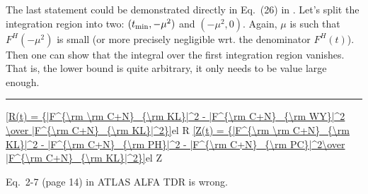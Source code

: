 The last statement could be demonstrated directly in Eq.~(26) in . Let's split the integration region into two: $(t_{\rm min}, -\mu^2)$ and $(-\mu^2, 0)$. Again, $\mu$ is such that $F^H(-\mu^2)$ is small (or more precisely negligible wrt. the denominator $F^H(t)$). Then one can show that the integral over the first integration region vanishes. That is, the lower bound is quite arbitrary, it only needs to be value large enough.

\iffalse
\eqref{F^{\rm C+H}_{\rm WY} = F^C(t) e^{i\al\Ph(t) + F^H(t) }}{el WY}
\TODO{Comment on FC and FH, c.f. Eq.~(6) in \bref{wy68}}

\eqref{\Phi_{\rm WY}(t) =  -\al\log {t\over t_{\rm min}} + \int\limits_{t_{\rm min}}^0 {\d t'\over |t-t'|} \left({F^H(t')\over F^H(t)} - 1\right) }{el phase WY}
\TODO{Check the sign of the second term!!!}


The \KL{} formula.
\eqref{F^{\rm C+H}_{\rm KL}(t) = \pm {\al s\over t} f^2(t) + F^H(t)\ e^{i\al\Ps(t)}\ ,}{el FCH KL}
where
\eqref{\Ps_{\rm KL}(t) = \mp \int\limits_{t_{\rm min}}^0 \d t' \left[ \log {t'\over t} \left( f^2(t') \right)' - {1\over 2\pi} \left({F^H(t')\over F^H(t)} - 1\right) I(t, t') \right]}{el phase KL}
\eqref{I(t, t') = \int\limits_0^{2\pi} \d\ph {f^2(t'')\over t''}\ ,\qquad t'' = t + t' + 2\sqrt{t t'} \cos\ph\ .}{el KL I}

Compared to \bref{kl94} we wrote the correction to the hadronic amplitude in a exponentiated way. Both are, in principle, equivalent since the phase $\Phi_{\rm KL}$ has been derived under the assumption that $\O{\al^2}$ terms can be neglected. Another assumption leading to this phase was that $f(t_{\rm min}) = 0$. Although this is a very good assumption for any real form factor, it makes it uneasy to compare the phases of \KL{} and \WY. Fortunately, it is easy to correct \Eq{el phase KL} to allow for any form factor dependence:
\eqref{\Ps_{\rm KL,corr}(t) = \Ps_{\rm KL}(t) \pm f^2(t_{\rm min}) \log {t\over t_{\rm min}}\ .}{el phase KL corr}
Now it is easy to verify that the WY phase corresponds to KL phase, if no form factors are used:
\eqref{\Ps_{\rm KL,corr}(t) \mathop{\longrightarrow}\limits^{f(t)\to 1} - \Ph_{\rm WY}(t)}{el KL WY correspondance}

\TODO{Check signs}
\fi

\vskip1cm
\hrule

\eqref{R(t) = {|F^{\rm \rm C+N}_{\rm KL}|^2 - |F^{\rm C+N}_{\rm WY}|^2 \over |F^{\rm C+N}_{\rm KL}|^2}}{el R}
\eqref{Z(t) = {|F^{\rm \rm C+N}_{\rm KL}|^2 - |F^{\rm C+N}_{\rm PH}|^2 - |F^{\rm C+N}_{\rm PC}|^2\over |F^{\rm C+N}_{\rm KL}|^2}}{el Z}



Eq.~2-7 (page 14) in ATLAS ALFA TDR  is wrong.


